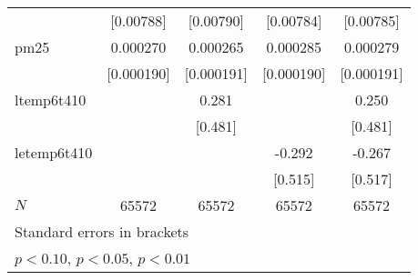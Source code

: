 {\begin{tabular}{l*{4}{c}}
            &   [0.00788]         &   [0.00790]         &   [0.00784]         &   [0.00785]         \\
[1em]
pm25        &    0.000270         &    0.000265         &    0.000285         &    0.000279         \\
            &  [0.000190]         &  [0.000191]         &  [0.000190]         &  [0.000191]         \\
[1em]
ltemp6t410  &                     &       0.281         &                     &       0.250         \\
            &                     &     [0.481]         &                     &     [0.481]         \\
[1em]
letemp6t410 &                     &                     &      -0.292         &      -0.267         \\
            &                     &                     &     [0.515]         &     [0.517]         \\
\hline
\(N\)       &       65572         &       65572         &       65572         &       65572         \\
\hline\hline
\multicolumn{5}{l}{\footnotesize Standard errors in brackets}\\
\multicolumn{5}{l}{\footnotesize \sym{*} \(p<0.10\), \sym{**} \(p<0.05\), \sym{***} \(p<0.01\)}\\
\end{tabular}
}
